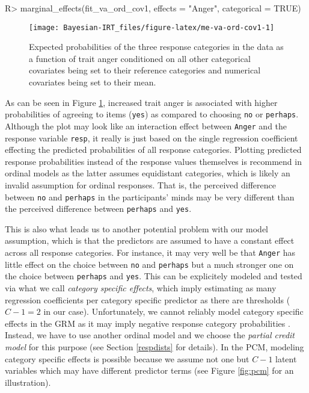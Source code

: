 \documentclass[jss]{jss}
\begin{document}
\begin{CodeChunk}

\begin{CodeInput}
R> marginal_effects(fit_va_ord_cov1, effects = "Anger", categorical = TRUE)
\end{CodeInput}
\begin{figure}

{\centering \texttt{[image: Bayesian-IRT\_files/figure-latex/me-va-ord-cov1-1]} 

}

\caption[Expected probabilities of the three response categories in the  data as a function of trait anger conditioned on all other categorical covariates being set to their reference categories and numerical covariates being set to their mean]{Expected probabilities of the three response categories in the  data as a function of trait anger conditioned on all other categorical covariates being set to their reference categories and numerical covariates being set to their mean.}\label{fig:me-va-ord-cov1}
\end{figure}
\end{CodeChunk}

As can be seen in Figure \ref{fig:me-va-ord-cov1}, increased trait anger
is associated with higher probabilities of agreeing to items
(\texttt{yes}) as compared to choosing \texttt{no} or \texttt{perhaps}.
Although the plot may look like an interaction effect between
\texttt{Anger} and the response variable \texttt{resp}, it really is
just based on the single regression coefficient effecting the predicted
probabilities of all response categories. Plotting predicted response
probabilities instead of the response values themselves is recommend in
ordinal models as the latter assumes equidistant categories, which is
likely an invalid assumption for ordinal responses. That is, the
perceived difference between \texttt{no} and \texttt{perhaps} in the
participants' minds may be very different than the perceived difference
between \texttt{perhaps} and \texttt{yes}.

This is also what leads us to another potential problem with our model
assumption, which is that the predictors are assumed to have a constant
effect across all response categories. For instance, it may very well be
that \texttt{Anger} has little effect on the choice between \texttt{no}
and \texttt{perhaps} but a much stronger one on the choice between
\texttt{perhaps} and \texttt{yes}. This can be explicitely modeled and
tested via what we call \emph{category specific effects}, which imply
estimating as many regression coefficients per category specific
predictor as there are thresholds (\(C - 1 = 2\) in our case).
Unfortunately, we cannot reliably model category specific effects in the
GRM as it may imply negative response category probabilities
\citep{buerkner2019}. Instead, we have to use another ordinal model and
we choose the \emph{partial credit model} \citep[PCM;][]{rasch1961} for
this purpose (see Section \ref{respdists} for details). In the PCM,
modeling category specific effects is possible because we assume not one
but \(C - 1\) latent variables which may have different predictor terms
(see Figure \ref{fig:pcm} for an illustration).
\end{document}
